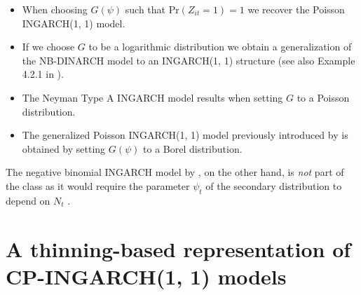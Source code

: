\documentclass[review]{elsarticle}
\begin{document}
\begin{itemize}
\item When choosing $G(\psi)$ such that $\text{Pr}(Z_{it} = 1) = 1$ we recover the Poisson INGARCH(1, 1) model.
\item If we choose $G$ to be a logarithmic distribution %
we obtain a generalization of the NB-DINARCH model \cite{Xu2012} to an INGARCH(1, 1) structure (see also Example 4.2.1 in \cite{Weiss2018}). %
\item The Neyman Type A INGARCH model \cite{Goncalves2015a} results when setting $G$ to a Poisson distribution. %
\item The generalized Poisson INGARCH(1, 1) model previously introduced by \cite{Zhu2012} is obtained by setting $G(\psi)$ to a Borel distribution. %
\end{itemize}
The negative binomial INGARCH model by \cite{Zhu2011}, on the other hand, is \textit{not} part of the class as it would require the parameter $\psi_t$ of the secondary distribution to depend on $N_t$ .

\section{A thinning-based representation of CP-INGARCH(1, 1) models}
\label{sec:alternative_formulation}
\end{document}
